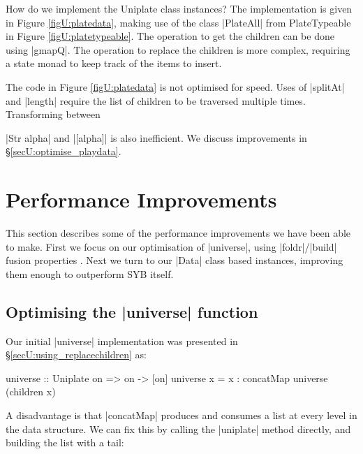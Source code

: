 How do we implement the Uniplate class instances? The implementation is given in Figure \ref{figU:platedata}, making use of the class |PlateAll| from PlateTypeable in Figure \ref{figU:platetypeable}. The operation to get the children can be done using |gmapQ|. The operation to replace the children is more complex, requiring a state monad to keep track of the items to insert.

The code in Figure \ref{figU:platedata} is not optimised for speed. Uses of |splitAt| and |length| require the list of children to be traversed multiple times. Transforming between \ignore|Str alpha| and |[alpha]| is also inefficient. We discuss improvements in \S\ref{secU:optimise_playdata}.


\section{Performance Improvements}
\label{secU:performance}

This section describes some of the performance improvements we have been able to make. First we focus on our optimisation of |universe|, using |foldr|/|build| fusion properties \cite{spj:rules}. Next we turn to our |Data| class based instances, improving them enough to outperform SYB itself.

\subsection{Optimising the |universe| function}
\label{secU:optimise_everything}

Our initial |universe| implementation was presented in \S\ref{secU:using_replacechildren} as:

\begin{code}
universe :: Uniplate on => on -> [on]
universe x = x : concatMap universe (children x)
\end{code}

A disadvantage is that |concatMap| produces and consumes a list at every level in the data structure. We can fix this by calling the |uniplate| method directly, and building the list with a tail:

\begin{onepage}
\end{onepage}

